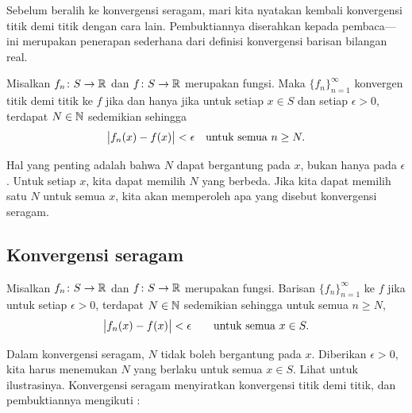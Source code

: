 Sebelum beralih ke konvergensi seragam, mari kita nyatakan kembali konvergensi
titik demi titik dengan cara lain.
Pembuktiannya diserahkan kepada pembaca---ini merupakan penerapan sederhana dari
definisi konvergensi barisan bilangan real.

\begin{prop} \label{ptwsconv:prop}
Misalkan $f_n \colon S \to {\mathbb{R}}$ dan $f \colon S \to {\mathbb{R}}$ merupakan fungsi.
Maka $\{ f_n \}_{n=1}^\infty$ konvergen titik demi titik ke $f$ jika dan hanya jika
untuk setiap $x \in S$ dan setiap $\epsilon > 0$, terdapat
$N \in {\mathbb{N}}$ sedemikian sehingga
\begin{equation*}
\bigl\lvert {f_n(x)-f(x)} \bigr\rvert < \epsilon \quad \text{untuk semua } n \geq N .
\end{equation*}
\end{prop}

Hal yang penting adalah bahwa $N$ dapat bergantung pada $x$, bukan hanya pada
$\epsilon$.  Untuk setiap $x$, kita dapat memilih $N$ yang berbeda.
Jika kita dapat memilih satu $N$ untuk semua $x$, kita akan memperoleh apa yang disebut
konvergensi seragam.

\subsection{Konvergensi seragam}

\begin{defn}
Misalkan $f_n \colon S \to {\mathbb{R}}$
dan $f \colon S \to {\mathbb{R}}$
merupakan fungsi.  Barisan $\{ f_n \}_{n=1}^\infty$
\emph{} ke $f$ jika untuk
setiap $\epsilon > 0$, terdapat $N \in {\mathbb{N}}$ sedemikian sehingga
untuk semua $n \geq N$,
\begin{equation*}
\bigl\lvert {f_n(x) - f(x)} \bigr\rvert < \epsilon \qquad \text{untuk semua } x \in S.
\end{equation*}
\end{defn}
\begin{myfigureht}
\caption{Dalam konvergensi seragam,
untuk $n \geq N$,
fungsi-fungsi $f_n$ berada di dalam pita $\pm\epsilon$ di sekitar $f$.%
\label{fig:uniformconv}}
\end{myfigureht}

Dalam konvergensi seragam, $N$ tidak boleh bergantung pada $x$.  Diberikan $\epsilon > 0$,
kita harus menemukan $N$ yang berlaku untuk semua $x \in S$.  Lihat
 untuk ilustrasinya.
Konvergensi seragam
menyiratkan konvergensi titik demi titik, dan pembuktiannya mengikuti
:

